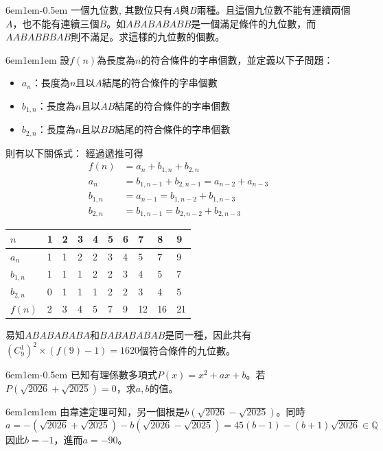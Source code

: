 \documentclass[12pt]{article}
\def\pA{-0.5em}
\def\Ap{1em}
\begin{document}
\begin{mybox}[Problem 3]{6em}{1em}{\pA}
    一個九位數, 其數位只有$A$與$B$兩種。且這個九位數不能有連續兩個$A$，也不能有連續三個$B$。如$ABABABABB$是一個滿足條件的九位數，而$AABABBBAB$則不滿足。求這樣的九位數的個數。
\end{mybox}
\begin{mybox}[Answer]{6em}{1em}{\Ap}
    設$f\left(n\right)$為長度為$n$的符合條件的字串個數，並定義以下子問題：
    \begin{itemize}
        \item $a_n$：長度為$n$且以$A$結尾的符合條件的字串個數
        \item $b_{1,n}$：長度為$n$且以$AB$結尾的符合條件的字串個數
        \item $b_{2,n}$：長度為$n$且以$BB$結尾的符合條件的字串個數
    \end{itemize}
    則有以下關係式：
    經過遞推可得
    \begin{align*}
        f\left(n\right)&=a_n+b_{1,n}+b_{2,n}\\
        a_n&=b_{1,n-1}+b_{2,n-1}=a_{n-2}+a_{n-3}\\
        b_{1,n}&=a_{n-1}=b_{1,n-2}+b_{1,n-3}\\
        b_{2,n}&=b_{1,n-1}=b_{2,n-2}+b_{2,n-3}
    \end{align*}
    \begin{table}[H]
        \centering
        \begin{tabularx}{\textwidth}{|X|X|X|X|X|X|X|X|X|X|}
        \hline
        $n$ & 1 & 2 & 3 & 4 & 5 & 6 & 7 & 8 & 9 \\ \hline
        $a_n$ & 1 & 1 & 2 & 2 & 3 & 4 & 5 & 7 & 9 \\ \hline
        $b_{1,n}$ & 1 & 1 & 1 & 2 & 2 & 3 & 4 & 5 & 7 \\ \hline
        $b_{2,n}$ & 0 & 1 & 1 & 1 & 2 & 2 & 3 & 4 & 5 \\ \hline
        $f(n)$ & 2 & 3 & 4 & 5 & 7 & 9 & 12 & 16 & 21 \\ \hline
        \end{tabularx}
    \end{table}
    易知$ABABABABA$和$BABABABAB$是同一種，因此共有$\left(C_{9}^{1}\right)^2\times\left(f\left(9\right)-1\right)=1620$個符合條件的九位數。
\end{mybox}

\begin{mybox}[Problem 4]{6em}{1em}{\pA}
    已知有理係數多項式$P\left(x\right)=x^2+ax+b$。若$P\left(\sqrt{2026} + \sqrt{2025}\right) = 0$，求$a, b$的值。
\end{mybox}
\begin{mybox}[Answer]{6em}{1em}{\Ap}
    由韋達定理可知，另一個根是$b\left(\sqrt{2026} - \sqrt{2025}\right)$。同時
    $$
    a=-\left(\sqrt{2026} + \sqrt{2025}\right)-b\left(\sqrt{2026} - \sqrt{2025}\right)=45\left(b-1\right)-\left(b+1\right)\sqrt{2026}\in\mathbb{Q}
    $$
    因此$b=-1$，進而$a=-90$。
\end{mybox}
\end{document}
